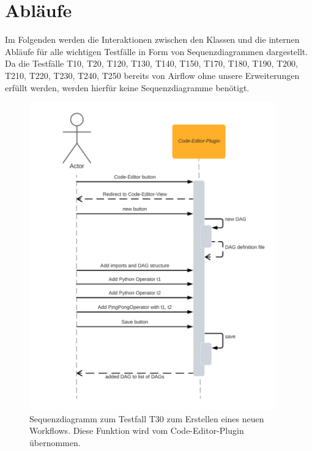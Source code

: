 \chapter{Abläufe}
Im Folgenden werden die Interaktionen zwischen den Klassen und die internen Abläufe für alle wichtigen Testfälle in Form von Sequenzdiagrammen dargestellt. \\
Da die Testfälle T10, T20, T120, T130, T140, T150, T170, T180, T190, T200, T210, T220, T230, T240, T250 bereits von Airflow ohne unsere Erweiterungen erfüllt werden, werden hierfür keine Sequenzdiagramme benötigt. %

\begin{figure}[ht]
    \centering
    \includegraphics[width=0.95\textwidth]{Diagramme/Sequenzdiagramm T30.png}
    \caption{Sequenzdiagramm zum Testfall T30 zum Erstellen eines neuen Workflows.
    Diese Funktion wird vom Code-Editor-Plugin übernommen.}
    \label{fig:SQD_T30}
\end{figure}


